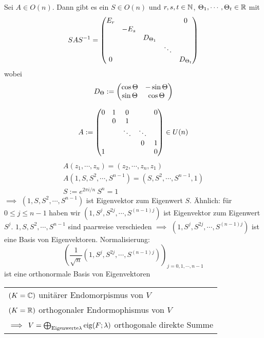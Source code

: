 \begin{Kor}
  Sei $A\in O(n)$. Dann gibt es ein $S\in O(n)$ und $r,s,t\in \mathbb{N}$, $\Theta_1,\cdots,\Theta_t\in\mathbb{R}$ mit
  \[SAS^{-1}=\begin{pmatrix}E_r&&&&0\\ &-E_s&&&\\&&D_{\Theta_1}&&\\&&&\ddots&\\0&&&&D_{\Theta_t}\end{pmatrix}\]
  wobei
  \[D_\Theta:=\begin{pmatrix}\cos\Theta&-\sin \Theta\\ \sin\Theta&\cos\Theta\end{pmatrix}\]
\end{Kor}
\begin{Bsp}
  \[A:=\begin{pmatrix}0&1&0&&0\\&0&1&&\\&&\ddots&\ddots&\\&&&0&1\\ 1&&&&0 \end{pmatrix}\in U(n)\]
  \begin{align*}
    A(z_1,\cdots,z_n)=(z_2,\cdots,z_n,z_1)\\
    A(1,S,S^2,\cdots,S^{n-1})=(S,S^2,\cdots,S^{n-1},1)\\
    S:=e^{2\pi i/n}\ S^n=1
  \end{align*}
  $\implies$ $(1,S,S^2,\cdots,S^{n-1})$ ist Eigenvektor zum Eigenwert $S$. Ähnlich: für $0\leq j \leq n-1$ haben wir $(1,S^j,S^{2j},\cdots,S^{(n-1)j})$ ist Eigenvektor zum Eigenwert $S^j$. $1,S,S^2,\cdots,S^{n-1}$ sind paarweise verschieden $\implies$ $(1,S^j,S^{2j},\cdots,S^{(n-1)j})$ ist eine Basis von Eigenvektoren. Normalisierung:
  \[\left( \frac{1}{\sqrt{n}}\left( 1,S^j,S^{2j},\cdots,S^{(n-1)j} \right) \right)_{j=0,1,\cdots,n-1}\]
  ist eine orthonormale Basis von Eigenvektoren
\end{Bsp}
\begin{Faz}
  \begin{tabular}[htb]{l}
    $(K=\mathbb{C})$ unitärer Endomorpismus von $V$\\
    $(K=\mathbb{R})$ orthogonaler Endormophismus von $V$\\
    $\implies$ $V=\bigoplus_{\text{Eigenwerte} \lambda} \operatorname{eig} (F;\lambda)$ orthogonale direkte Summe
  \end{tabular}
\end{Faz}

